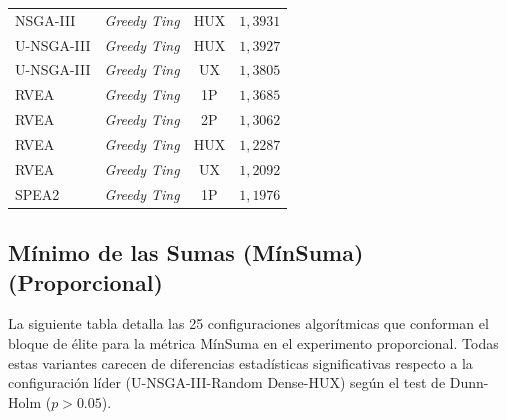 \begin{longtable}{lccc}
NSGA-III & \textit{Greedy Ting} & HUX & $1{,}3931$ \\
U-NSGA-III & \textit{Greedy Ting} & HUX & $1{,}3927$ \\
U-NSGA-III & \textit{Greedy Ting} & UX & $1{,}3805$ \\
RVEA & \textit{Greedy Ting} & 1P & $1{,}3685$ \\
RVEA & \textit{Greedy Ting} & 2P & $1{,}3062$ \\
RVEA & \textit{Greedy Ting} & HUX & $1{,}2287$ \\
RVEA & \textit{Greedy Ting} & UX & $1{,}2092$ \\
SPEA2 & \textit{Greedy Ting} & 1P & $1{,}1976$ \\
\end{longtable}

\subsection{Mínimo de las Sumas (MínSuma) (Proporcional)}\label{anexo:elite_minsum_prop}

La siguiente tabla detalla las 25 configuraciones algorítmicas que conforman el bloque de élite para la métrica MínSuma en el experimento proporcional. Todas estas variantes carecen de diferencias estadísticas significativas respecto a la configuración líder (U-NSGA-III-Random Dense-HUX) según el test de Dunn-Holm ($p > 0.05$).

